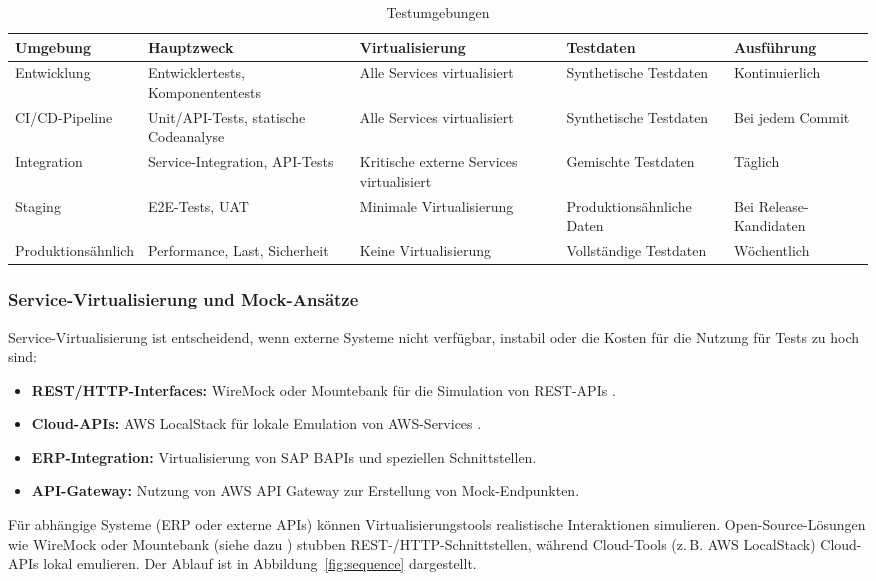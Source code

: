 \begin{longtable}{|p{3cm}|p{3cm}|p{3cm}|p{3cm}|p{2cm}|}
\caption{Testumgebungen} \\ \hline    
\hline
\textbf{Umgebung} & \textbf{Hauptzweck} & \textbf{Virtualisierung} & \textbf{Testdaten} & \textbf{Ausführung} \\
\hline
Entwicklung & Entwicklertests, Komponententests & Alle Services virtualisiert & Synthetische Testdaten & Kontinuierlich \\
\hline
CI/CD-Pipeline & Unit/API-Tests, statische Codeanalyse & Alle Services virtualisiert & Synthetische Testdaten & Bei jedem Commit \\
\hline
Integration & Service-Integration, API-Tests & Kritische externe Services virtualisiert & Gemischte Testdaten & Täglich \\
\hline
Staging & E2E-Tests, UAT & Minimale Virtualisierung & Produktionsähnliche Daten & Bei Release-Kandidaten \\
\hline
Produktionsähnlich & Performance, Last, Sicherheit & Keine Virtualisierung & Vollständige Testdaten & Wöchentlich \\
\hline
\end{longtable}

\subsubsection{Service-Virtualisierung und Mock-Ansätze}
Service-Virtualisierung ist entscheidend, wenn externe Systeme nicht verfügbar, instabil oder die
Kosten für die Nutzung für Tests zu hoch sind:

\begin{itemize}
    \item \textbf{REST/HTTP-Interfaces:} WireMock oder Mountebank für die Simulation von REST-APIs
    \cite{wiremock2025}.
    \item \textbf{Cloud-APIs:} AWS LocalStack für lokale Emulation von AWS-Services \cite{aws2021}.
    \item \textbf{ERP-Integration:} Virtualisierung von SAP BAPIs und speziellen Schnittstellen.
    \item \textbf{API-Gateway:} Nutzung von AWS API Gateway zur Erstellung von Mock-Endpunkten.
\end{itemize}

Für abhängige Systeme (ERP oder externe APIs) können Virtualisierungstools realistische
Interaktionen simulieren. Open-Source-Lösungen wie WireMock oder Mountebank
(siehe dazu \citet{byars2018}) stubben REST-/HTTP-Schnittstellen, während Cloud-Tools
(z.\,B. AWS LocalStack) Cloud-APIs lokal emulieren. Der Ablauf ist in Abbildung~\ref{fig:sequence}
dargestellt.

